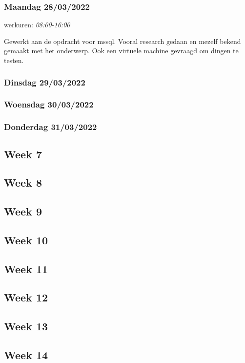 \subsubsection{Maandag 28/03/2022}

werkuren: \emph{08:00-16:00}

Gewerkt aan de opdracht voor mssql. Vooral research gedaan en mezelf
bekend gemaakt met het onderwerp. Ook een virtuele machine gevraagd om dingen te testen.


\subsubsection{Dinsdag 29/03/2022}
\subsubsection{Woensdag 30/03/2022}
\subsubsection{Donderdag 31/03/2022}


\subsection{Week 7}
\subsection{Week 8}
\subsection{Week 9}
\subsection{Week 10}
\subsection{Week 11}
\subsection{Week 12}
\subsection{Week 13}
\subsection{Week 14}